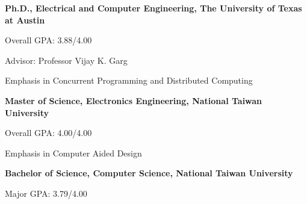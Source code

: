

\begin{myexp}
\item \textbf{Ph.D., Electrical and Computer Engineering, The
    University of Texas at Austin}   
   \begin{myexp}
   \item Overall GPA: 3.88/4.00  
   \item Advisor: Professor Vijay K. Garg
   \item Emphasis in Concurrent Programming and Distributed Computing
   \end{myexp}
\item \textbf{Master of Science, Electronics Engineering, National Taiwan
    University}  
   \begin{myexp}
   \item Overall GPA: 4.00/4.00
   \item Emphasis in Computer Aided Design

   \end{myexp}
\item \textbf{Bachelor of Science, Computer Science, National Taiwan
    University}  
   \begin{myexp}
   \item Major GPA: 3.79/4.00 
   \end{myexp}
\end{myexp}
